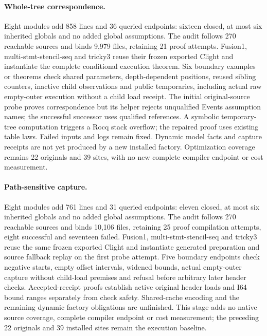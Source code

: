 \paragraph{Whole-tree correspondence.}
Eight modules add 858 lines and 36 queried endpoints: sixteen closed, at most
six inherited globals and no added global assumptions. The audit follows 270
reachable sources and binds 9,979 files, retaining 21 proof attempts.
Fusion1, multi-stmt-stencil-seq and tricky3 reuse their frozen exported Clight
and instantiate the complete conditional execution theorem. Six boundary
examples or theorems check shared parameters, depth-dependent positions,
reused sibling counters, inactive child observations and public temporaries,
including actual raw empty-outer execution without a child load receipt.
The initial original-source probe proves correspondence but its helper rejects
unqualified Events assumption names; the successful successor uses qualified
references. A symbolic temporary-tree computation triggers a Rocq stack overflow;
the repaired proof uses existing table laws. Failed inputs and logs remain fixed.
Dynamic model facts and capture receipts are not yet produced by a new installed
factory. Optimization coverage remains 22 originals and 39 sites, with no new
complete compiler endpoint or cost measurement.

\paragraph{Path-sensitive capture.}
Eight modules add 761 lines and 31 queried endpoints: eleven closed, at most six
inherited globals and no added global assumptions. The audit follows 270 reachable
sources and binds 10,106 files, retaining 25 proof compilation attempts, eight
successful and seventeen failed. Fusion1, multi-stmt-stencil-seq and tricky3 reuse
the same frozen exported Clight and instantiate generated preparation and source
fallback replay on the first probe attempt. Five boundary endpoints check negative
starts, empty offset intervals, widened bounds, actual empty-outer capture without
child-load premises and refusal before arbitrary later header checks.
Accepted-receipt proofs establish active original header loads and I64 bound ranges
separately from check safety. Shared-cache encoding and the remaining dynamic
factory obligations are unfinished. This stage adds no native source coverage,
complete compiler endpoint or cost measurement; the preceding 22 originals and
39 installed sites remain the execution baseline.

